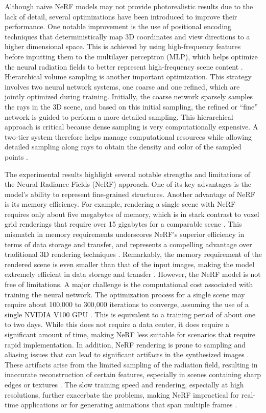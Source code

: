 Although naive NeRF models may not provide photorealistic results due to the lack of detail, several optimizations have been introduced to improve their performance. One notable improvement is the use of positional encoding techniques that deterministically map 3D coordinates and view directions to a higher dimensional space. This is achieved by using high-frequency features before inputting them to the multilayer perceptron (MLP), which helps optimize the neural radiation fields to better represent high-frequency scene content \citep{mildenhallNERF}. Hierarchical volume sampling is another important optimization. This strategy involves two neural network systems, one coarse and one refined, which are jointly optimized during training. Initially, the coarse network sparsely samples the rays in the 3D scene, and based on this initial sampling, the refined or ``fine'' network is guided to perform a more detailed sampling. This hierarchical approach is critical because dense sampling is very computationally expensive. A two-tier system therefore helps manage computational resources while allowing detailed sampling along rays to obtain the density and color of the sampled points \citep{arandjelović2021nerf}.

The experimental results highlight several notable strengths and limitations of the Neural Radiance Fields (NeRF) approach. One of its key advantages is the model's ability to represent fine-grained structures. Another advantage of NeRF is its memory efficiency. For example, rendering a single scene with NeRF requires only about five megabytes of memory, which is in stark contrast to voxel grid renderings that require over 15 gigabytes for a comparable scene \citep{mildenhallNERF}. This mismatch in memory requirements underscores NeRF's superior efficiency in terms of data storage and transfer, and represents a compelling advantage over traditional 3D rendering techniques \citep{mildenhallNERF}. Remarkably, the memory requirement of the rendered scene is even smaller than that of the input images, making the model extremely efficient in data storage and transfer \citep{mildenhallNERF}.
However, the NeRF model is not free of limitations. A major challenge is the computational cost associated with training the neural network. The optimization process for a single scene may require about 100,000 to 300,000 iterations to converge, assuming the use of a single NVIDIA V100 GPU \citep{mildenhallNERF}. This is equivalent to a training period of about one to two days. While this does not require a data center, it does require a significant amount of time, making NeRF less suitable for scenarios that require rapid implementation. In addition, NeRF rendering is prone to sampling and aliasing issues that can lead to significant artifacts in the synthesized images \citep{rabby2023beyondpixels}. These artifacts arise from the limited sampling of the radiation field, resulting in inaccurate reconstruction of certain features, especially in scenes containing sharp edges or textures \citep{rabby2023beyondpixels}. The slow training speed and rendering, especially at high resolutions, further exacerbate the problems, making NeRF impractical for real-time applications or for generating animations that span multiple frames \citep{rabby2023beyondpixels}.

